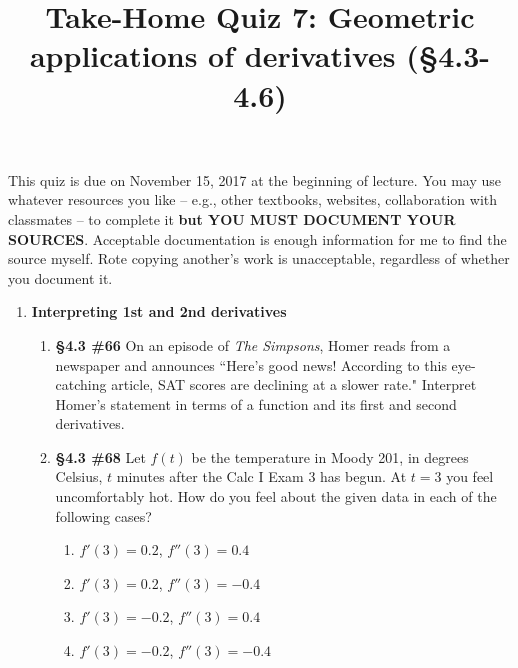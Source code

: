 \documentclass[%
]{article}
\title{\vspace{-3.5pc} 
	\flushleft \bf \Large Take-Home Quiz 7: Geometric applications of derivatives %
	 (\S4.3-4.6)}
\date{}
\begin{document}
\maketitle

\vspace{-3pc}
 This quiz is due on November 15, 2017 at the beginning of lecture.  You may use whatever resources you like -- e.g., other textbooks, websites, collaboration with classmates -- to complete it \textbf{but YOU MUST DOCUMENT YOUR SOURCES}.  Acceptable documentation is enough information for me to find the source myself.  Rote copying another's work is unacceptable, regardless of whether you document it.  

\noindent\hrulefill

\begin{enumerate}
\item \textbf{Interpreting 1st and 2nd derivatives}
	\begin{enumerate}
	\item {\bf \S4.3 \#66}  On an episode of \textit{The Simpsons}, Homer reads from a newspaper and announces ``Here's good news!  According to this eye-catching article, SAT scores are declining at a slower rate."  Interpret Homer's statement in terms of a function and its first and second derivatives.
	\item {\bf \S4.3 \#68} Let $f(t)$ be the temperature in Moody 201, in degrees Celsius, $t$ minutes after the Calc I Exam 3 has begun.  At $t=3$ you feel uncomfortably hot.  How do you feel about the given data in each of the following cases?
		\begin{enumerate}
		\item $f'(3)=0.2$, $f''(3)=0.4$
		\item $f'(3)=0.2$, $f''(3)=-0.4$
		\item $f'(3)=-0.2$, $f''(3)=0.4$
		\item $f'(3)=-0.2$, $f''(3)=-0.4$
		\end{enumerate}
	\end{enumerate}
	

\end{enumerate}
\end{document}
